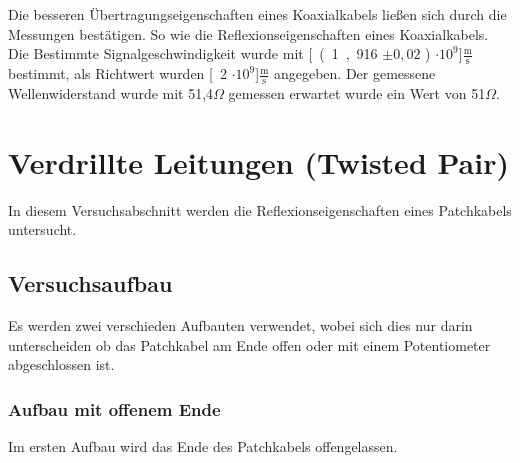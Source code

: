 \documentclass[12pt,a4paper]{article}
\begin{document}
Die besseren Übertragungseigenschaften eines Koaxialkabels ließen sich durch die Messungen bestätigen. So wie die Reflexionseigenschaften eines Koaxialkabels. Die Bestimmte Signalgeschwindigkeit wurde mit \unit[(1,916 $\pm 0,02$ ) $\cdot 10^9$]{$\frac{\text{m}}{\text{s}}$} bestimmt, als Richtwert wurden \unit[2 $\cdot 10^9$]{$\frac{\text{m}}{\text{s}}$} angegeben. Der gemessene Wellenwiderstand wurde mit 51,4$\Omega$ gemessen erwartet wurde ein Wert von 51$\Omega$.




\section{Verdrillte Leitungen (Twisted Pair)}

In diesem Versuchsabschnitt werden die Reflexionseigenschaften eines Patchkabels untersucht.

\subsection{Versuchsaufbau}
Es werden zwei verschieden Aufbauten verwendet, wobei sich dies nur darin unterscheiden ob das Patchkabel am Ende offen oder mit einem Potentiometer abgeschlossen ist.

\subsubsection{Aufbau mit offenem Ende}

Im ersten Aufbau wird das Ende des Patchkabels offengelassen.
\end{document}
